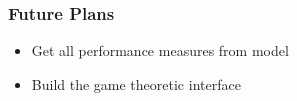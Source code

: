 \begin{frame}
    \frametitle{Future Plans}

    \begin{itemize}
        \item Get all performance measures from model
        \item Build the game theoretic interface
    \end{itemize}

\end{frame}